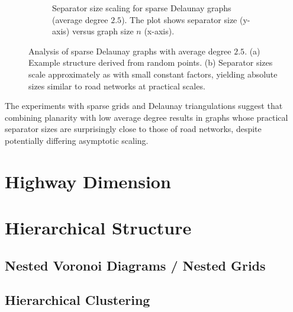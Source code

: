 \begin{figure}
\begin{subfigure}{0.55\linewidth}
        \caption{Separator size scaling for sparse Delaunay graphs (average degree \(2.5\)). The plot shows separator size (y-axis) versus graph size \(n\) (x-axis).}
        \label{fig:sparse_delaunay_sep_plot} %
    \end{subfigure}
    \caption{Analysis of sparse Delaunay graphs with average degree \(2.5\). (a) Example structure derived from random points. (b) Separator sizes scale approximately as  with small constant factors, yielding absolute sizes similar to road networks at practical scales.}
    \label{fig:sparse_delaunay_separators} %
\end{figure}

The experiments with sparse grids and Delaunay triangulations suggest that combining planarity with low average degree results in graphs whose practical separator sizes are surprisingly close to those of road networks, despite potentially differing asymptotic scaling.

\section{Highway Dimension}
\label{sec:synthetic:highway_dimension}

\section{Hierarchical Structure}
\label{sec:synthetic:hierarchical_structure}

\subsection{Nested Voronoi Diagrams / Nested Grids}
\label{sec:synthetic:nested_voronoi}

\subsection{Hierarchical Clustering}
\label{sec:synthetic:hierarchical_clustering}

